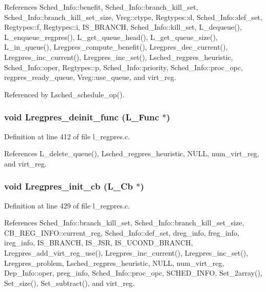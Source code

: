 References Sched\_\-Info::benefit, Sched\_\-Info::branch\_\-kill\_\-set, Sched\_\-Info::branch\_\-kill\_\-set\_\-size, Vreg::ctype, Regtypes::d, Sched\_\-Info::def\_\-set, Regtypes::f, Regtypes::i, IS\_\-BRANCH, Sched\_\-Info::kill\_\-set, L\_\-dequeue(), L\_\-enqueue\_\-regpres(), L\_\-get\_\-queue\_\-head(), L\_\-get\_\-queue\_\-size(), L\_\-in\_\-queue(), Lregpres\_\-compute\_\-benefit(), Lregpres\_\-dec\_\-current(), Lregpres\_\-inc\_\-current(), Lregpres\_\-inc\_\-set(), Lsched\_\-regpres\_\-heuristic, Sched\_\-Info::oper, Regtypes::p, Sched\_\-Info::priority, Sched\_\-Info::proc\_\-opc, regpres\_\-ready\_\-queue, Vreg::use\_\-queue, and virt\_\-reg.

Referenced by Lsched\_\-schedule\_\-op().
\subsubsection{\setlength{\rightskip}{0pt plus 5cm}void Lregpres\_\-deinit\_\-func (L\_\-Func $\ast$)}\label{l__schedule_8h_9f2d57bd870fd926308781a6c2892c42}




Definition at line 412 of file l\_\-regpres.c.

References L\_\-delete\_\-queue(), Lsched\_\-regpres\_\-heuristic, NULL, num\_\-virt\_\-reg, and virt\_\-reg.
\subsubsection{\setlength{\rightskip}{0pt plus 5cm}void Lregpres\_\-init\_\-cb (L\_\-Cb $\ast$)}\label{l__schedule_8h_503927a80e2d6aa324f47919932e7b1f}




Definition at line 429 of file l\_\-regpres.c.

References Sched\_\-Info::branch\_\-kill\_\-set, Sched\_\-Info::branch\_\-kill\_\-set\_\-size, CB\_\-REG\_\-INFO::current\_\-reg, Sched\_\-Info::def\_\-set, dreg\_\-info, freg\_\-info, ireg\_\-info, IS\_\-BRANCH, IS\_\-JSR, IS\_\-UCOND\_\-BRANCH, Lregpres\_\-add\_\-virt\_\-reg\_\-use(), Lregpres\_\-inc\_\-current(), Lregpres\_\-inc\_\-set(), Lregpres\_\-problem, Lsched\_\-regpres\_\-heuristic, NULL, num\_\-virt\_\-reg, Dep\_\-Info::oper, preg\_\-info, Sched\_\-Info::proc\_\-opc, SCHED\_\-INFO, Set\_\-2array(), Set\_\-size(), Set\_\-subtract(), and virt\_\-reg.

